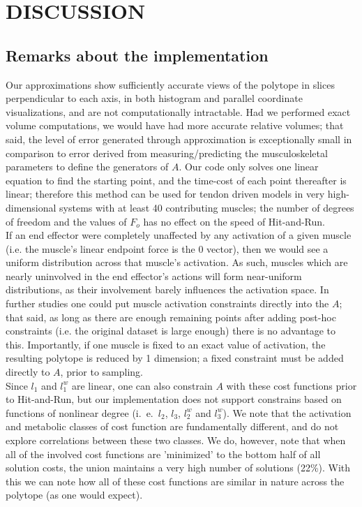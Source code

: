 \section{DISCUSSION}
\subsection{Remarks about the implementation}
Our approximations show sufficiently accurate views of the polytope in slices perpendicular to each axis, in both histogram and parallel coordinate visualizations, and are not computationally intractable.
Had we performed exact volume computations, we would have had more accurate relative volumes; that said, the level of error generated through approximation is exceptionally small in comparison to error derived from measuring/predicting the musculoskeletal parameters to define the generators of $A$.
Our code only solves one linear equation to find the starting point, and the time-cost of each point thereafter is linear; therefore this method can be used for tendon driven models in very high-dimensional systems with at least 40 contributing muscles; the number of degrees of freedom and the values of $F_o$ has no effect on the speed of Hit-and-Run.\\

If an end effector were completely unaffected by any activation of a given muscle (i.e. the muscle's linear endpoint force is the 0 vector), then we would see a uniform distribution across that muscle's activation. As such, muscles which are nearly uninvolved in the end effector's actions will form near-uniform distributions, as their involvement barely influences the activation space.
In further studies one could put muscle activation constraints directly into the $A$; that said, as long as there are enough remaining points after adding post-hoc constraints (i.e. the original dataset is large enough) there is no advantage to this.
Importantly, if one muscle is fixed to an exact value of activation, the resulting polytope is reduced by 1 dimension; a fixed constraint must be added directly to $A$, prior to sampling.\\
Since $l_1$ and $l_1^w$ are linear, one can also constrain $A$ with these cost functions prior to Hit-and-Run, but our implementation does not support constrains based on functions of nonlinear degree (i.\ e.\ $l_2$, $l_3$, $l_2^w$ and $l_3^w$).
We note that the activation and metabolic classes of cost function are fundamentally different, and do not explore correlations between these two classes.
We do, however, note that when all of the involved cost functions are 'minimized' to the bottom half of all solution costs, the union maintains a very high number of solutions (22\%).
With this we can note how all of these cost functions are similar in nature across the polytope (as one would expect).\\

